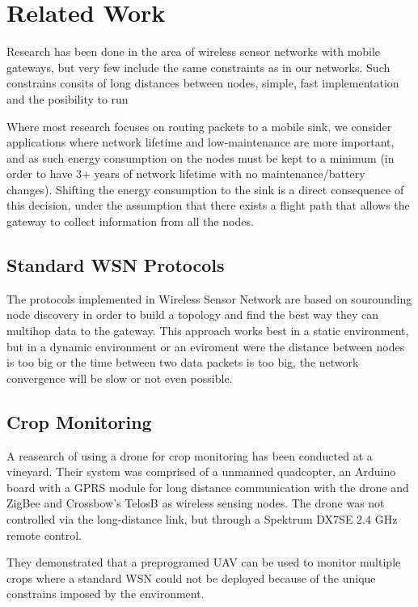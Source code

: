\normalfont\normalsize
\chapter{Related Work}

Research has been done in the area of wireless sensor networks with mobile gateways, but very few include the same constraints as in our networks. Such constrains consits of long distances between nodes, simple, fast implementation and the posibility to run 

Where most research focuses on routing packets to a mobile sink, we consider applications where network lifetime and low-maintenance are more important, and as such energy consumption on the nodes must be kept to a minimum (in order to have 3+ years of network lifetime
with no maintenance/battery changes). Shifting the energy consumption to the sink is a direct consequence of this decision, under the assumption that there exists a flight path that allows the gateway to collect information from all the nodes.

\section{Standard WSN Protocols}

The protocols implemented in Wireless Sensor Network are based on sourounding node discovery in order to build a topology and find the best way they can multihop data to the gateway. This approach works best in a static environment, but in a dynamic environment or an eviroment were the distance between nodes is too big or the time between two data packets is too big, the network convergence will be slow or not even possible.

\section{Crop Monitoring} \cite{valente2011air}

A reasearch of using a drone for crop monitoring has been conducted at a vineyard. Their system was comprised of a unmanned quadcopter, an Arduino board with a GPRS module for long distance communication with  the drone and ZigBee and Crossbow’s TelosB as wireless sensing nodes. The drone was not controlled via the long-distance link, but through a Spektrum DX7SE 2.4 GHz remote control.

They demonstrated that a preprogramed UAV can be used to monitor multiple crops where a standard WSN could not be deployed because of the unique constrains imposed by the environment.

